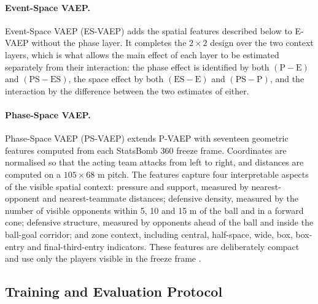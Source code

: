 \documentclass[runningheads]{llncs}
\begin{document}
\paragraph{\textbf{Event-Space VAEP.}}

Event-Space VAEP (ES-VAEP) adds the spatial features described below to E-VAEP without the phase layer. It completes the $2 \times 2$ design over the two context layers, which is what allows the main effect of each layer to be estimated separately from their interaction: the phase effect is identified by both $(\mathrm{P} - \mathrm{E})$ and $(\mathrm{PS} - \mathrm{ES})$, the space effect by both $(\mathrm{ES} - \mathrm{E})$ and $(\mathrm{PS} - \mathrm{P})$, and the interaction by the difference between the two estimates of either.

\paragraph{\textbf{Phase-Space VAEP.}}
\label{sec:spatial}

Phase-Space VAEP (PS-VAEP) extends P-VAEP with seventeen geometric features computed from each StatsBomb 360 freeze frame. Coordinates are normalised so that the acting team attacks from left to right, and distances are computed on a $105 \times 68$ m pitch. The features capture four interpretable aspects of the visible spatial context: pressure and support, measured by nearest-opponent and nearest-teammate distances; defensive density, measured by the number of visible opponents within 5, 10 and 15 m of the ball and in a forward cone; defensive structure, measured by opponents ahead of the ball and inside the ball-goal corridor; and zone context, including central, half-space, wide, box, box-entry and final-third-entry indicators. These features are deliberately compact and use only the players visible in the freeze frame \cite{statsbomb2021freezeframe}.


\subsection{Training and Evaluation Protocol}
\end{document}
